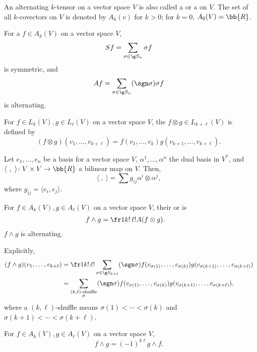 An alternating $k$-tensor on a vector space $V$ is also called a  or a  on $V$. The set of all $k$-covectors on $V$ is denoted by $A_k(v)$ for $k > 0$; for $k = 0$, $A_0 (V) = \bb{R}$.

For a $f \in A_k(V)$ on a vector space $V$,
\[
 Sf = \sum_{\sigma \in \g S_n} \sigma f
\]
is symmetric, and
\[
 Af = \sum_{\sigma \in \g S_n} (\sgn \sigma) \sigma f
\]
is alternating.

For $f \in L_k(V), g \in L_\ell(V)$ on a vector space $V$, the  $f \otimes g \in L_{k+\ell}(V)$ is defined by
\[
(f \otimes g) (v_1, \dotsc, v_{k+\ell}) = f(v_1,\dotsc,v_k)g(v_{k+1},\dotsc,v_{k+\ell}).
\]

Let $e_1,\dotsc,e_n$ be a basis for a vector space $V$, $\alpha^1,\dotsc,\alpha^n$ the dual basis in $V^*$, and $\langle\ ,\ \rangle \colon V \times V \to \bb{R}$ a bilinear map on $V$. Then,
\[
\langle\ , \ \rangle = \sum g_{ij} \alpha^i \otimes \alpha^j,
\]
where $g_{ij} = \langle e_i, e_j \rangle$.

For $f \in A_k(V), g \in A_\ell(V)$ on a vector space $V$, their  or  is
\begin{align*}
f \wedge g &= \fr1{k!\, \ell!} A( f \otimes g).
\end{align*}
$f \wedge g$ is alternating.

Explicitly,
\begin{align*}
(f \wedge g) (v_1,\dotsc,v_{k+\ell}) &= \fr1{k!\,\ell!} \sum_{\sigma \in \g S_{k+\ell}} (\sgn \sigma)f(v_{\sigma(1)},\dotsc,v_{\sigma(k)}) g(v_{\sigma(k+1)},\dotsc,v_{\sigma(k+\ell)}) \\
&= \sum_{\substack{(k,\ell)\text{-shuffle}\\ \sigma}} (\sgn \sigma) f(v_{\sigma(1)},\dotsc,v_{\sigma(k)}) g(v_{\sigma(k+1)},\dotsc,v_{\sigma(k+\ell)}),
\end{align*}
where a $(k,\ell)$-shuffle means $\sigma(1)<\dotsb<\sigma(k)$ and $\sigma(k+1)<\dotsb < \sigma(k+\ell)$.

For $f \in A_k (V), g \in A_\ell(V)$ on a vector space $V$,
\[
f \wedge g = (-1)^{k\ell} g \wedge f.
\]

